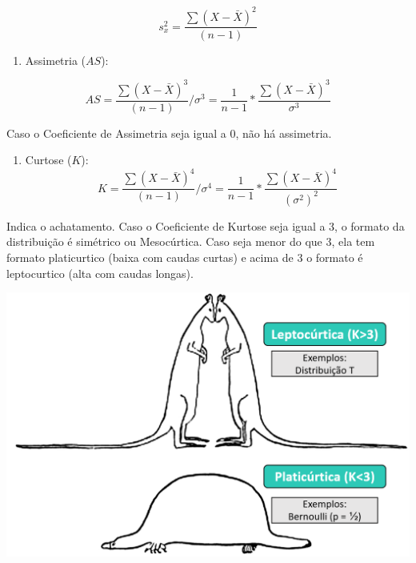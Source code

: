 \documentclass[
]{book}
\providecommand{\tightlist}{%
  \setlength{\itemsep}{0pt}\setlength{\parskip}{0pt}}
\begin{document}
\[s^{2}_{x}=\frac{\sum (X-\bar{X})^{2}}{(n-1)}\]

\begin{enumerate}
\def\labelenumi{\arabic{enumi}.}
\setcounter{enumi}{2}
\tightlist
\item
  Assimetria (\(AS\)):
\end{enumerate}

\[AS = \frac{\sum (X-\bar{X})^{3}}{(n-1)}/\sigma^3 = \frac{1}{n-1} *\frac{\sum (X-\bar{X})^3}{\sigma^3}\]

Caso o Coeficiente de Assimetria seja igual a 0, não há assimetria.

\begin{enumerate}
\def\labelenumi{\arabic{enumi}.}
\setcounter{enumi}{3}
\tightlist
\item
  Curtose (\(K\)):\\
  \[K = \frac{\sum (X-\bar{X})^{4}}{(n-1)}/\sigma^4= \frac{1}{n-1} *\frac{\sum (X-\bar{X})^4}{({\sigma^2})^2}\]
\end{enumerate}

Indica o achatamento. Caso o Coeficiente de Kurtose seja igual a 3, o formato da distribuição é simétrico ou Mesocúrtica. Caso seja menor do que 3, ela tem formato platicurtico (baixa com caudas curtas) e acima de 3 o formato é leptocurtico (alta com caudas longas).

\includegraphics{./img/cap_desc_curtose.png}
\end{document}
